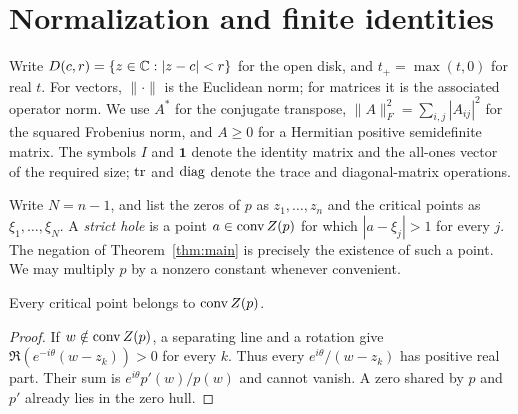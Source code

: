 \section{Normalization and finite identities}\label{sec:preliminaries}

Write $D(c,r)=\{z\in\mathbb C:|z-c|<r\}$ for the open disk, and
$t_+=\max(t,0)$ for real $t$.
For vectors, $\|\cdot\|$ is the Euclidean norm; for matrices it is
the associated operator norm. We use $A^*$ for the conjugate transpose,
$\|A\|_F^2=\sum_{i,j}|A_{ij}|^2$ for the squared Frobenius norm,
and $A\ge0$ for a Hermitian positive semidefinite matrix.
The symbols $I$ and $\mathbf1$ denote the identity matrix and the
all-ones vector of the required size; $\operatorname{tr}$ and $\operatorname{diag}$ denote
the trace and diagonal-matrix operations.

Write $N=n-1$, and list the zeros of $p$ as $z_1,\ldots,z_n$ and
the critical points as $\xi_1,\ldots,\xi_N$. A \emph{strict hole}
is a point $a\in\operatorname{conv} Z(p)$ for which $|a-\xi_j|>1$ for every $j$.
The negation of Theorem~\ref{thm:main} is precisely the existence of
such a point. We may multiply $p$ by a nonzero constant whenever
convenient.

\begin{lemma}\label{pr:gauss-lucas}
Every critical point belongs to $\operatorname{conv} Z(p)$.
\end{lemma}
\begin{proof}
If $w\notin\operatorname{conv} Z(p)$, a separating line and a rotation give
$\Re(e^{-i\theta}(w-z_k))>0$ for every $k$. Thus every
$e^{i\theta}/(w-z_k)$ has positive real part. Their sum is
$e^{i\theta}p'(w)/p(w)$ and cannot vanish. A zero shared by $p$
and $p'$ already lies in the zero hull.
\end{proof}

